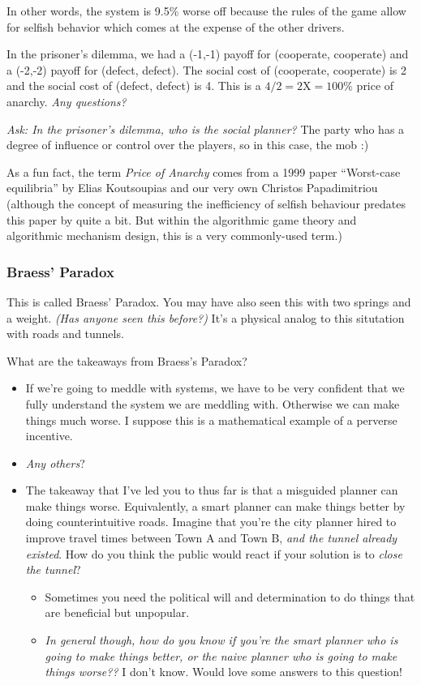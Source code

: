 \documentclass[11pt]{article}
\begin{document}
In other words, the system is 9.5\% worse off because the rules of the game allow for selfish behavior which comes at the expense of the other drivers. 


In the prisoner's dilemma, we had a (-1,-1) payoff for (cooperate, cooperate) and a (-2,-2) payoff for (defect, defect). The social cost of (cooperate, cooperate) is 2 and the social cost of (defect, defect) is 4. This is a $4/2 = 2\text{X} = 100\%$ price of anarchy. {\it Any questions?}

{\it Ask: In the prisoner's dilemma, who is the social planner?} The party who has a degree of influence or control over the players, so in this case, the mob :) 

As a fun fact, the term {\it Price of Anarchy} comes from a 1999 paper ``Worst-case equilibria'' by  Elias Koutsoupias and our very own Christos Papadimitriou (although the concept of measuring the inefficiency of selfish behaviour predates this paper by quite a bit. But within the algorithmic game theory and algorithmic mechanism design, this is a very commonly-used term.)

\subsubsection{Braess' Paradox}

This is called Braess' Paradox. You may have also seen this with two springs and a weight. {\it(Has anyone seen this before?)} It's a physical analog to this situtation with roads and tunnels. 

What are the takeaways from Braess's Paradox?
\begin{itemize}
    \item If we're going to meddle with systems, we have to be very confident that we fully understand the system we are meddling with. Otherwise we can make things much worse. I suppose this is a mathematical example of a perverse incentive. 
    \item {\it Any others}?
    \item The takeaway that I've led you to thus far is that a misguided planner can make things worse. Equivalently, a smart planner can make things better by doing counterintuitive roads. Imagine that you're the city planner hired to improve travel times between Town A and Town B, {\it and the tunnel already existed}. How do you think the public would react if your solution is to {\it close the tunnel}?
    \begin{itemize}
        \item Sometimes you need the political will and determination to do things that are beneficial but unpopular.
        \item {\it In general though, how do you know if you're the smart planner who is going to make things better, or the naive planner who is going to make things worse??} I don't know. Would love some answers to this question! 
    \end{itemize}
\end{itemize}
\end{document}
